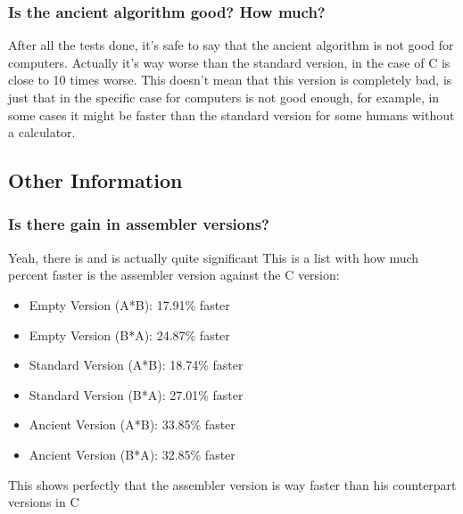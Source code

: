 \documentclass[legalpaper,12pt]{article}
\begin{document}
    \subsubsection{Is the ancient algorithm good? How much?}
        \justifying
        After all the tests done, it's safe to say that the ancient algorithm is not good for computers. Actually it's way worse than the standard version, in the case of C is close to 10 times worse. This doesn't mean that this version is completely bad, is just that in the specific case for computers is not good enough, for example, in some cases it might be faster than the standard version for some humans without a calculator.
\newpage

\subsection{Other Information}
    \subsubsection{Is there gain in assembler versions?}
        \justifying
        Yeah, there is and is actually quite significant This is a list with how much percent faster is the assembler version against the C version:
        \begin{itemize}
            \item Empty Version (A*B): 17.91\% faster
            \item Empty Version (B*A): 24.87\% faster
            \item Standard Version (A*B): 18.74\% faster
            \item Standard Version (B*A): 27.01\% faster
            \item Ancient Version (A*B): 33.85\% faster
            \item Ancient Version (B*A): 32.85\% faster
        \end{itemize}
        \justifying
        This shows perfectly that the assembler version is way faster than his counterpart versions in C
        
\end{document}
